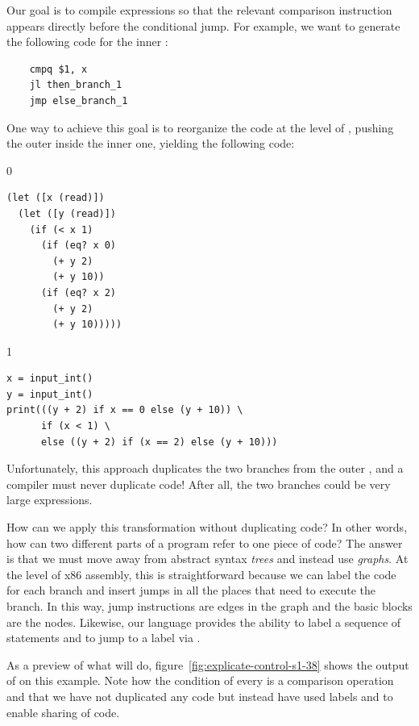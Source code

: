 \documentclass[7x10]{TimesAPriori_MIT}%
\def\racketEd{0}
\def\pythonEd{1}
\def\edition{1}
\newcommand{\pythonColor}[0]{}
\numberwithin{theorem}{chapter}
\numberwithin{definition}{chapter}
\numberwithin{equation}{chapter}
\begin{document}
Our goal is to compile  expressions so that the relevant
comparison instruction appears directly before the conditional jump.
For example, we want to generate the following code for the inner
:
\begin{center}
\begin{minipage}{0.96\textwidth}
\begin{lstlisting}
    cmpq $1, x
    jl then_branch_1
    jmp else_branch_1
\end{lstlisting}
\end{minipage}
\end{center}
One way to achieve this goal is to reorganize the code at the level of
\LangIf{}, pushing the outer  inside the inner one, yielding
the following code:
\begin{center}
\begin{minipage}{0.96\textwidth}
{\if\edition\racketEd        
\begin{lstlisting}
(let ([x (read)])
  (let ([y (read)])
    (if (< x 1) 
      (if (eq? x 0)
        (+ y 2)
        (+ y 10))
      (if (eq? x 2)
        (+ y 2)
        (+ y 10)))))
\end{lstlisting}
\fi}
{\if\edition\pythonEd\pythonColor
\begin{lstlisting}
x = input_int()
y = input_int()
print(((y + 2) if x == 0 else (y + 10)) \
      if (x < 1) \
      else ((y + 2) if (x == 2) else (y + 10)))
\end{lstlisting}
\fi}
\end{minipage}
\end{center}
Unfortunately, this approach duplicates the two branches from the
outer , and a compiler must never duplicate code!  After all,
the two branches could be very large expressions.

How can we apply this transformation without duplicating code? In
other words, how can two different parts of a program refer to one
piece of code?
%
The answer is that we must move away from abstract syntax \emph{trees}
and instead use \emph{graphs}.
%
At the level of x86 assembly, this is straightforward because we can
label the code for each branch and insert jumps in all the places that
need to execute the branch. In this way, jump instructions are edges
in the graph and the basic blocks are the nodes.
%
Likewise, our language \LangCIf{} provides the ability to label a
sequence of statements and to jump to a label via .

As a preview of what  will do,
figure~\ref{fig:explicate-control-s1-38} shows the output of
\code{explicate\_control} on this example. Note how the condition of
every \code{if} is a comparison operation and that we have not
duplicated any code but instead have used labels and \code{goto} to
enable sharing of code.
\end{document}
